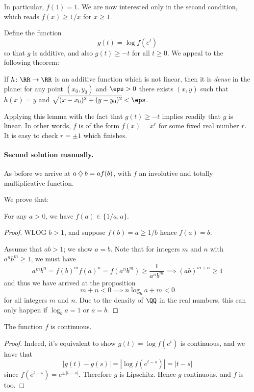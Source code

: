 \documentclass[11pt]{scrartcl}
\begin{document}
In particular, $f(1) = 1$.
We are now interested only in the second condition,
which reads $f(x) \ge 1/x$ for $x \ge 1$.

Define the function
\[ g(t) = \log f(e^t) \]
so that $g$ is additive,
and also $g(t) \ge -t$ for all $t \ge 0$.
We appeal to the following theorem:
\begin{lemma*}
  If $h \colon \RR \to \RR$ is an additive function
  which is not linear,
  then it is \emph{dense} in the plane:
  for any point $(x_0, y_0)$ and $\eps > 0$
  there exists $(x,y)$ such that $h(x) = y$
  and $\sqrt{(x-x_0)^2 + (y-y_0)^2} < \eps$.
\end{lemma*}
Applying this lemma with the fact
that $g(t) \ge -t$ implies readily that $g$ is linear.
In other words, $f$ is of the form $f(x) = x^r$
for some fixed real number $r$.
It is easy to check $r =\pm 1$ which finishes.

\paragraph{Second solution manually.}
As before we arrive at $a \mathbin{\diamondsuit} b = af(b)$,
with $f$ an involutive and totally multiplicative function.

We prove that:
\begin{claim*}
  For any $a > 0$, we have $f(a) \in \{1/a, a\}$.
\end{claim*}
\begin{proof}
  WLOG $b > 1$, and suppose $f(b) = a \ge 1/b$ hence $f(a) = b$.

  Assume that $ab > 1$; we show $a = b$.
  Note that for integers $m$ and $n$ with $a^n b^m \ge 1$,
  we must have
  \[ a^m b^n = f(b)^m f(a)^n
  = f(a^n b^m) \ge \frac{1}{a^n b^m} \implies (ab)^{m+n} \ge 1 \]
  and thus we have arrived at the proposition
  \[ m+n < 0 \implies n \log_b a + m < 0 \]
  for all integers $m$ and $n$.
  Due to the density of $\QQ$ in the real numbers,
  this can only happen if $\log_b a = 1$ or $a = b$.
\end{proof}

\begin{claim*}
  The function $f$ is continuous.
\end{claim*}
\begin{proof}
  Indeed, it's equivalent to show
  $g(t) = \log f(e^t)$ is continuous,
  and we have that
  \[
    \left\lvert g(t)-g(s) \right\rvert
    = \left\lvert \log f(e^{t-s}) \right\rvert
    = \left\lvert t-s \right\rvert
  \]
  since $f(e^{t-s}) = e^{\pm |t-s|}$.
  Therefore $g$ is Lipschitz.
  Hence $g$ continuous, and $f$ is too.
\end{proof}
\end{document}
